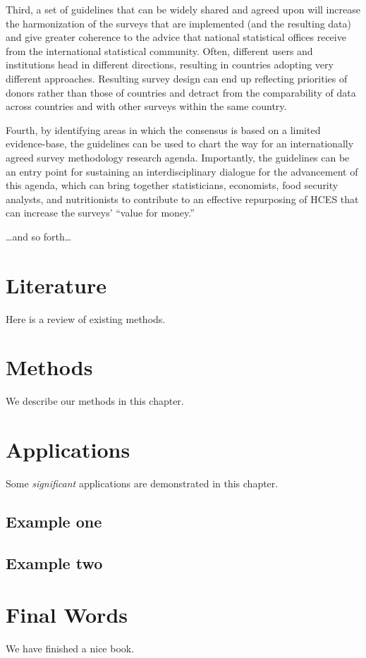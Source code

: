 \documentclass[
]{book}
\begin{document}
Third, a set of guidelines that can be widely shared and agreed upon will increase the harmonization of the surveys that are implemented (and the resulting data) and give greater coherence to the advice that national statistical offices receive from the international statistical community. Often, different users and institutions head in different directions, resulting in countries adopting very different approaches. Resulting survey design can end up reflecting priorities of donors rather than those of countries and detract from the comparability of data across countries and with other surveys within the same country.

Fourth, by identifying areas in which the consensus is based on a limited evidence-base, the guidelines can be used to chart the way for an internationally agreed survey methodology research agenda. Importantly, the guidelines can be an entry point for sustaining an interdisciplinary dialogue for the advancement of this agenda, which can bring together statisticians, economists, food security analysts, and nutritionists to contribute to an effective repurposing of HCES that can increase the surveys' ``value for money.''

\ldots and so forth\ldots{}

\hypertarget{literature}{%
\chapter{Literature}\label{literature}}

Here is a review of existing methods.

\hypertarget{methods}{%
\chapter{Methods}\label{methods}}

We describe our methods in this chapter.

\hypertarget{applications}{%
\chapter{Applications}\label{applications}}

Some \emph{significant} applications are demonstrated in this chapter.

\hypertarget{example-one}{%
\section{Example one}\label{example-one}}

\hypertarget{example-two}{%
\section{Example two}\label{example-two}}

\hypertarget{final-words}{%
\chapter{Final Words}\label{final-words}}

We have finished a nice book.

  
\end{document}
